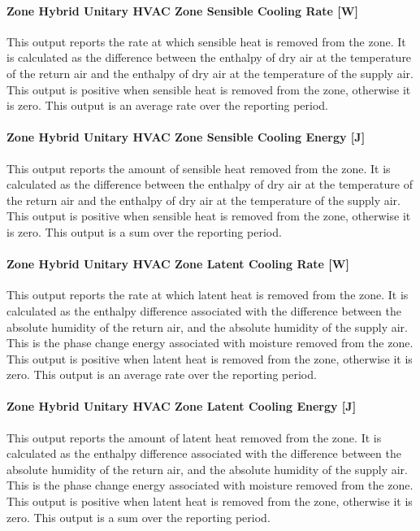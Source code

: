 \paragraph{Zone Hybrid Unitary HVAC Zone Sensible Cooling Rate [W]}
This output reports the rate at which sensible heat is removed from the zone.  It is calculated as the difference between the enthalpy of dry air at the temperature of the return air and the enthalpy of dry air at the temperature of the supply air. This output is positive when sensible heat is removed from the zone, otherwise it is zero.  This output is an average rate over the reporting period.

\paragraph{Zone Hybrid Unitary HVAC Zone Sensible Cooling Energy [J]}
This output reports the amount of sensible heat removed from the zone. It is calculated as the difference between the enthalpy of dry air at the temperature of the return air and the enthalpy of dry air at the temperature of the supply air.  This output is positive when sensible heat is removed from the zone, otherwise it is zero.  This output is a sum over the reporting period.

\paragraph{Zone Hybrid Unitary HVAC Zone Latent Cooling Rate [W]}
This output reports the rate at which latent heat is removed from the zone. It is calculated as the enthalpy difference associated with the difference between the absolute humidity of the return air, and the absolute humidity of the supply air. This is the phase change energy associated with moisture removed from the zone. This output is positive when latent heat is removed from the zone, otherwise it is zero.  This output is an average rate over the reporting period.

\paragraph{Zone Hybrid Unitary HVAC Zone Latent Cooling Energy [J]}
This output reports the amount of latent heat removed from the zone. It is calculated as the enthalpy difference associated with the difference between the absolute humidity of the return air, and the absolute humidity of the supply air. This is the phase change energy associated with moisture removed from the zone. This output is positive when latent heat is removed from the zone, otherwise it is zero.  This output is a sum over the reporting period.

